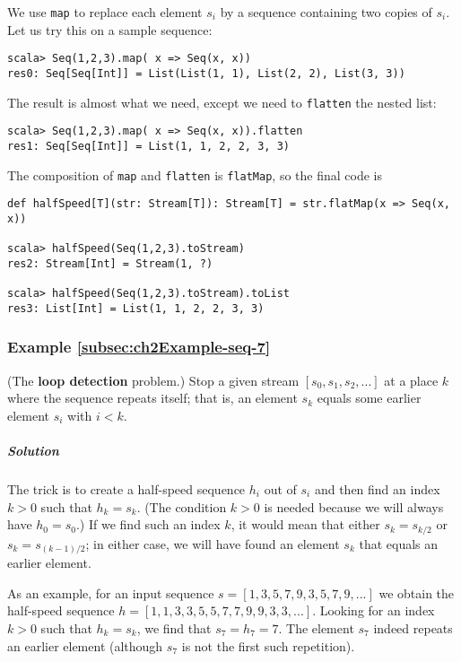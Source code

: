 We use \lstinline!map! to replace each element $s_{i}$ by a sequence
containing two copies of $s_{i}$. Let us try this on a sample sequence:
\begin{lstlisting}
scala> Seq(1,2,3).map( x => Seq(x, x))
res0: Seq[Seq[Int]] = List(List(1, 1), List(2, 2), List(3, 3))
\end{lstlisting}
The result is almost what we need, except we need to \lstinline!flatten!
the nested list:
\begin{lstlisting}
scala> Seq(1,2,3).map( x => Seq(x, x)).flatten
res1: Seq[Seq[Int]] = List(1, 1, 2, 2, 3, 3)
\end{lstlisting}
The composition of \lstinline!map! and \lstinline!flatten! is \lstinline!flatMap!,
so the final code is
\begin{lstlisting}
def halfSpeed[T](str: Stream[T]): Stream[T] = str.flatMap(x => Seq(x, x))

scala> halfSpeed(Seq(1,2,3).toStream)
res2: Stream[Int] = Stream(1, ?)

scala> halfSpeed(Seq(1,2,3).toStream).toList
res3: List[Int] = List(1, 1, 2, 2, 3, 3)
\end{lstlisting}


\subsubsection{Example \label{subsec:ch2Example-seq-7}\ref{subsec:ch2Example-seq-7}}

(The \textbf{loop detection} problem.) Stop
a given stream $\left[s_{0},s_{1},s_{2},...\right]$ at a place $k$
where the sequence repeats itself; that is, an element $s_{k}$ equals
some earlier element $s_{i}$ with $i<k$.

\subparagraph{Solution}

The trick is to create a half-speed sequence $h_{i}$ out of $s_{i}$
and then find an index $k>0$ such that $h_{k}=s_{k}$. (The condition
$k>0$ is needed because we will always have $h_{0}=s_{0}$.) If we
find such an index $k$, it would mean that either $s_{k}=s_{k/2}$
or $s_{k}=s_{\left(k-1\right)/2}$; in either case, we will have found
an element $s_{k}$ that equals an earlier element. 

As an example, for an input sequence $s=\left[1,3,5,7,9,3,5,7,9,...\right]$
we obtain the half-speed sequence $h=\left[1,1,3,3,5,5,7,7,9,9,3,3,...\right]$.
Looking for an index $k>0$ such that $h_{k}=s_{k}$, we find that
$s_{7}=h_{7}=7$. The element $s_{7}$ indeed repeats an earlier element
(although $s_{7}$ is not the first such repetition).

